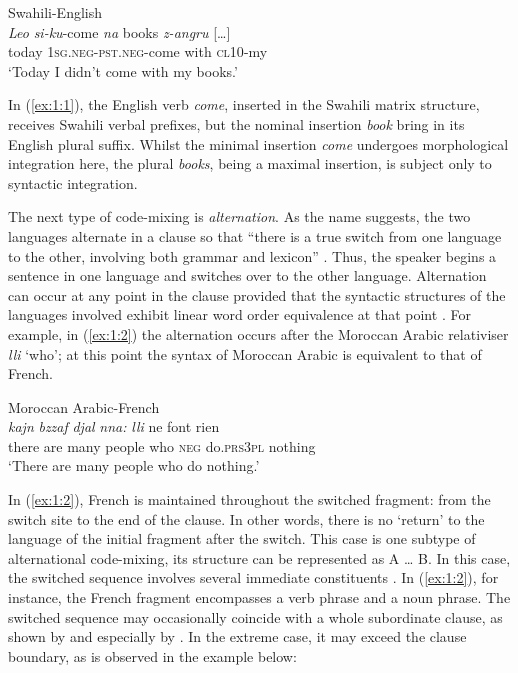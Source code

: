 \ea{\label{ex:1:1}} 
Swahili-English \citep[][80]{myers-scotton-duelling-1993}\\
\gll \textit{Leo} \textit{si-ku}-come \textit{na} books \textit{z-angru} {[\dots]}\\
	today \textsc{1sg.neg-pst.neg}-come with {} \textsc{cl10}-my\\
\glt `Today I didn't come with my books.' 
\z

\noindent In (\ref{ex:1:1}), the English verb \textit{come}, inserted in the Swahili matrix structure, receives Swahili verbal prefixes, but the nominal insertion \textit{book} bring in its English plural suffix. Whilst the minimal insertion \textit{come} undergoes morphological integration here, the plural \textit{books}, being a maximal insertion, is subject only to syntactic integration.

The next type of code-mixing is \textit{alternation}. As the name suggests, the two languages alternate in a clause so that ``there is a true switch from one language to the other, involving both grammar and lexicon'' \citep[5]{muysken-bilingual-2000}. Thus, the speaker begins a sentence in one language and switches over to the other language. Alternation can occur at any point in the clause provided that the syntactic structures of the languages involved exhibit linear word order equivalence at that point \citep[cf.][114]{muysken-bilingual-2000}. For example, in (\ref{ex:1:2}) the alternation occurs after the Moroccan Arabic relativiser \textit{lli} `who'; at this point the syntax of Moroccan Arabic is equivalent to that of French.

\ea
\label{ex:1:2}
Moroccan Arabic-French \citep[311]{bentahila-davies-1983}\\
\gll \textit{kajn} \textit{bzzaf} \textit{djal} \textit{nna:} \textit{lli} ne font rien\\
	there are many people who \textsc{neg} do.\textsc{prs3pl} nothing\\
\glt `There are many people who do nothing.'
\z

\noindent In (\ref{ex:1:2}), French is maintained throughout the switched fragment: from the switch site to the end of the clause. In other words, there is no `return' to the language of the initial fragment after the switch. This case is one subtype of alternational code-mixing, its structure can be represented as A \dots{} B. In this case, the switched sequence involves several immediate constituents \citep[cf.][96]{muysken-bilingual-2000}. In (\ref{ex:1:2}), for instance, the French fragment encompasses a verb phrase and a noun phrase. The switched sequence may occasionally coincide with a whole subordinate clause, as shown by \citet[312]{pfaff-1979} and especially by \citet[196--200]{treffers-daller-mixing-1994}. In the extreme case, it may exceed the clause boundary, as is observed in the example below:

